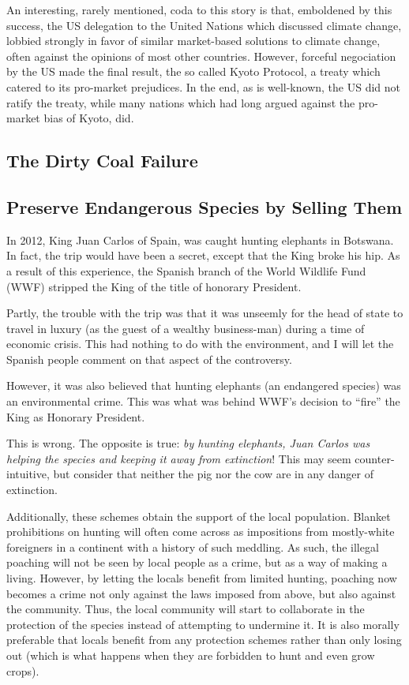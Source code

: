 An interesting, rarely mentioned, coda to this story is that, emboldened by
this success, the US delegation to the United Nations which discussed climate
change, lobbied strongly in favor of similar market-based solutions to climate
change, often against the opinions of most other countries. However, forceful
negociation by the US made the final result, the so called Kyoto Protocol, a
treaty which catered to its pro-market prejudices. In the end, as is
well-known, the US did not ratify the treaty, while many nations which had long
argued against the pro-market bias of Kyoto, did.

\subsection{The Dirty Coal Failure}

\subsection{Preserve Endangerous Species by Selling Them}

In 2012, King Juan Carlos of Spain, was caught hunting elephants in Botswana.
In fact, the trip would have been a secret, except that the King broke his hip.
As a result of this experience, the Spanish branch of the World Wildlife Fund
(WWF) stripped the King of the title of honorary President.

Partly, the trouble with the trip was that it was unseemly for the head of
state to travel in luxury (as the guest of a wealthy business-man) during a
time of economic crisis. This had nothing to do with the environment, and I
will let the Spanish people comment on that aspect of the controversy.

However, it was also believed that hunting elephants (an endangered species)
was an environmental crime. This was what was behind WWF's decision to ``fire''
the King as Honorary President.

This is wrong. The opposite is true: \emph{by hunting elephants, Juan Carlos
was helping the species and keeping it away from extinction}! This may seem
counter-intuitive, but consider that neither the pig nor the cow are in any
danger of extinction.

Additionally, these schemes obtain the support of the local population. Blanket
prohibitions on hunting will often come across as impositions from mostly-white
foreigners in a continent with a history of such meddling. As such, the illegal
poaching will not be seen by local people as a crime, but as a way of making a
living. However, by letting the locals benefit from limited hunting, poaching
now becomes a crime not only against the laws imposed from above, but also
against the community. Thus, the local community will start to collaborate in
the protection of the species instead of attempting to undermine it. It is also
morally preferable that locals benefit from any protection schemes rather than
only losing out (which is what happens when they are forbidden to hunt and even
grow crops).

